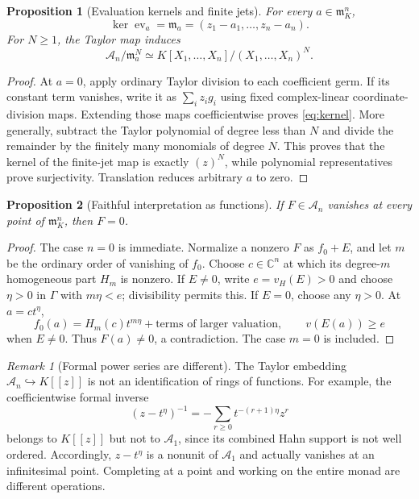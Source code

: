 \documentclass[11pt,letterpaper]{article}
\newtheorem{proposition}[proposition]{Proposition}
\theoremstyle{definition}
\theoremstyle{remark}
\newtheorem{remark}[remark]{Remark}
\newcommand{\C}{\mathbb C}
\newcommand{\A}{\mathscr A}
\newcommand{\m}{\mathfrak m}
\newcommand{\ev}{\operatorname{ev}}
\newcommand{\vH}{v_{\!H}}
\numberwithin{equation}{section}
\begin{document}
\begin{proposition}[Evaluation kernels and finite jets]\label{prop:kernels}
For every $a\in\m_K^n$,
\begin{equation}\label{eq:kernel}
 \ker\ev_a=\m_a=(z_1-a_1,\ldots,z_n-a_n).
\end{equation}
For $N\ge1$, the Taylor map induces
\begin{equation}\label{eq:jets}
 \A_n/\m_a^N\simeq K[X_1,\ldots,X_n]/(X_1,\ldots,X_n)^N.
\end{equation}
\end{proposition}
\begin{proof}
At $a=0$, apply ordinary Taylor division to each coefficient germ. If its constant term vanishes, write it as $\sum_i z_i g_i$ using fixed complex-linear coordinate-division maps. Extending those maps coefficientwise proves \eqref{eq:kernel}. More generally, subtract the Taylor polynomial of degree less than $N$ and divide the remainder by the finitely many monomials of degree $N$. This proves that the kernel of the finite-jet map is exactly $(z)^N$, while polynomial representatives prove surjectivity. Translation reduces arbitrary $a$ to zero.
\end{proof}

\begin{proposition}[Faithful interpretation as functions]\label{prop:faithful}
If $F\in\A_n$ vanishes at every point of $\m_K^n$, then $F=0$.
\end{proposition}
\begin{proof}
The case $n=0$ is immediate. Normalize a nonzero $F$ as $f_0+E$, and let $m$ be the ordinary order of vanishing of $f_0$. Choose $c\in\C^n$ at which its degree-$m$ homogeneous part $H_m$ is nonzero. If $E\ne0$, write $e=\vH(E)>0$ and choose $\eta>0$ in $\Gamma$ with $m\eta<e$; divisibility permits this. If $E=0$, choose any $\eta>0$. At $a=ct^\eta$,
\[
 f_0(a)=H_m(c)t^{m\eta}+\text{terms of larger valuation},
 \qquad v(E(a))\ge e
\]
when $E\ne0$. Thus $F(a)\ne0$, a contradiction. The case $m=0$ is included.
\end{proof}

\begin{remark}[Formal power series are different]\label{rem:formal-distinction}
The Taylor embedding $\A_n\hookrightarrow K[[z]]$ is not an identification of rings of functions. For example, the coefficientwise formal inverse
\[
 (z-t^\eta)^{-1}=-\sum_{r\ge0}t^{-(r+1)\eta}z^r
\]
belongs to $K[[z]]$ but not to $\A_1$, since its combined Hahn support is not well ordered. Accordingly, $z-t^\eta$ is a nonunit of $\A_1$ and actually vanishes at an infinitesimal point. Completing at a point and working on the entire monad are different operations.
\end{remark}
\end{document}
